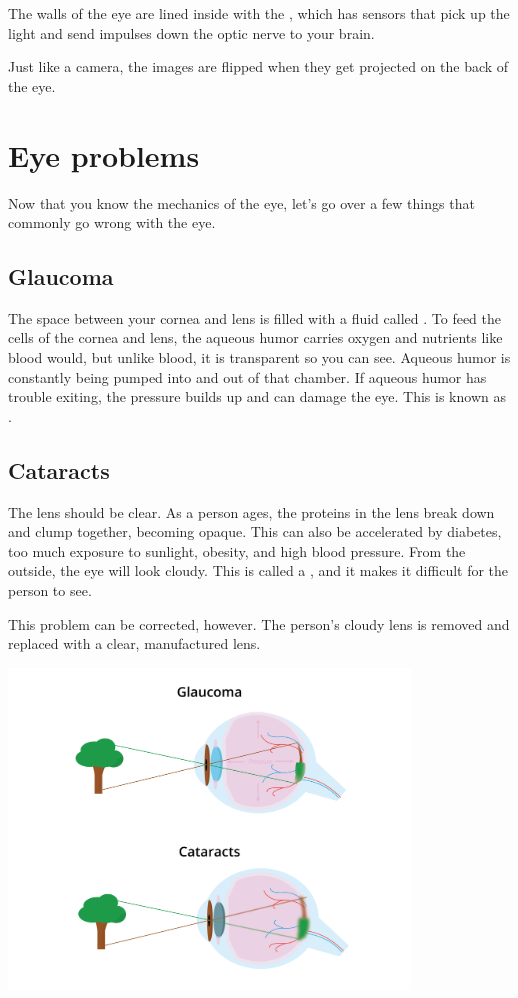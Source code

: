 The walls of the eye are lined inside with the , which has
 sensors that pick up the light and send impulses down the optic
nerve to your brain.

Just like a camera, the images are flipped when they get projected on
the back of the eye.

\section{Eye problems}

Now that you know the mechanics of the eye, let's go over a few
things that commonly go wrong with the eye.

\subsection{Glaucoma}

The space between your cornea and lens is filled with a fluid called
. To feed the cells of the cornea and lens,
the aqueous humor carries oxygen and nutrients like blood would, but unlike blood,
it is transparent so you can see. Aqueous humor is constantly being
pumped into and out of that chamber.  If aqueous humor has trouble
exiting, the pressure builds up and can damage the eye. This is known
as .

\subsection{Cataracts}

The lens should be clear. As a person ages, the proteins in the lens break down and clump
together, becoming opaque. This can also be accelerated by diabetes, too much exposure to sunlight, obesity, and high blood pressure. From the outside, the eye will look
cloudy. This is called a , and it makes it difficult
for the person to see.

This problem can be corrected, however. The person's cloudy lens is removed and
replaced with a clear, manufactured lens.

\includegraphics[width=0.8\textwidth]{cataractGlaucoma.png}

